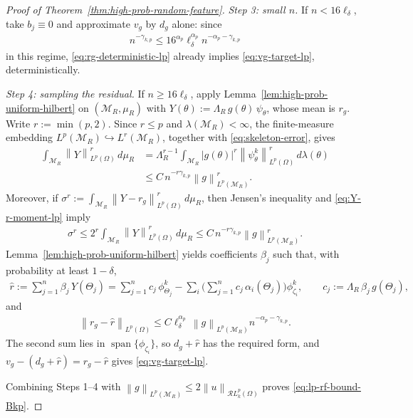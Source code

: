 \documentclass[12pt]{article}
\numberwithin{equation}{section}
\numberwithin{figure}{section}
\numberwithin{equation}{section}
\newcommand{\MR}{\mathcal M_R}
\newcommand{\norm}[1]{\left\|#1\right\|}
\newcommand{\abs}[1]{\left|#1\right|}
\DeclareMathOperator{\spanop}{span}
\begin{document}
\begin{proof}[Proof of Theorem~\ref{thm:high-prob-random-feature}]
\emph{Step 3: small $n$.} If $n<16\ell_\delta$, take $b_j\equiv0$ and approximate
$v_g$ by $d_g$ alone: since
\begin{align*}
    n^{-\gamma_{k,p}}
    \le 16^{\alpha_p}\ell_\delta^{\alpha_p}
    n^{-\alpha_p-\gamma_{k,p}}
\end{align*}
in this regime, \eqref{eq:rg-deterministic-lp} already implies
\eqref{eq:vg-target-lp}, deterministically.

\emph{Step 4: sampling the residual.} If $n\ge16\ell_\delta$, apply
Lemma~\ref{lem:high-prob-uniform-hilbert} on $(\MR,\mu_R)$ with
$Y(\theta):=\Lambda_R\,g(\theta)\,\psi_\theta$, whose mean is $r_g$. Write
$r:=\min(p,2)$. Since $r\le p$ and $\lambda(\MR)<\infty$, the finite-measure
embedding $L^p(\MR)\hookrightarrow L^r(\MR)$, together with \eqref{eq:skeleton-error},
gives
\begin{align}
    \int_{\MR}\norm{Y}_{L^p(\Omega)}^r\,d\mu_R
    &=\Lambda_R^{r-1}\int_{\MR}\abs{g(\theta)}^r
    \norm{\psi^k_\theta}_{L^p(\Omega)}^r\,d\lambda(\theta)
    \nonumber\\
    &\le C\,n^{-r\gamma_{k,p}}\norm{g}_{L^p(\MR)}^r.
    \label{eq:Y-r-moment-lp}
\end{align}
Moreover, if $\sigma^r:=\int_{\MR}\norm{Y-r_g}_{L^p(\Omega)}^r\,d\mu_R$, then
Jensen's inequality and \eqref{eq:Y-r-moment-lp} imply
\begin{align*}
    \sigma^r
    \le 2^r\int_{\MR}\norm{Y}_{L^p(\Omega)}^r\,d\mu_R
    \le C\,n^{-r\gamma_{k,p}}\norm{g}_{L^p(\MR)}^r.
\end{align*}
Lemma~\ref{lem:high-prob-uniform-hilbert} yields coefficients $\beta_j$ such that,
with probability at least $1-\delta$,
\begin{align*}
    \widehat r:=\sum_{j=1}^n\beta_j\,Y(\Theta_j)
    =\sum_{j=1}^n c_j\,\phi^k_{\Theta_j}
     -\sum_i\Big(\sum_{j=1}^n c_j\,\alpha_i(\Theta_j)\Big)\phi^k_{\zeta_i},
    \qquad c_j:=\Lambda_R\,\beta_j\,g(\Theta_j),
\end{align*}
and
\begin{align*}
    \norm{r_g-\widehat r}_{L^p(\Omega)}
    \le C\ell_\delta^{\alpha_p}\,\norm{g}_{L^p(\MR)}
    n^{-\alpha_p-\gamma_{k,p}}.
\end{align*}
The second sum lies in $\spanop\{\phi_{\zeta_i}\}$, so $d_g+\widehat r$ has the
required form, and $v_g-(d_g+\widehat r)=r_g-\widehat r$ gives
\eqref{eq:vg-target-lp}.

Combining Steps 1--4 with
$\norm{g}_{L^p(\MR)}\le2\norm{u}_{\mathcal{R}L^p_k(\Omega)}$ proves
\eqref{eq:lp-rf-bound-Bkp}.
\end{proof}
\end{document}
